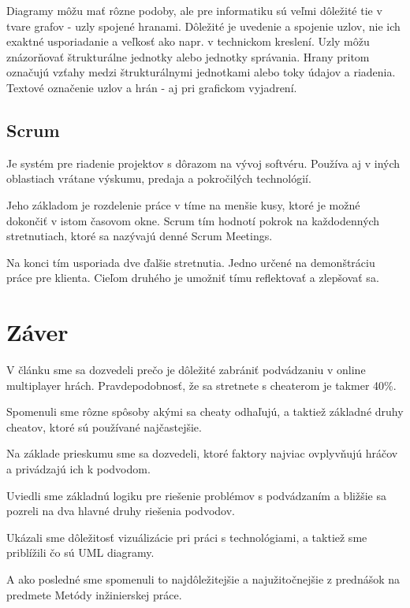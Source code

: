 \documentclass[10pt,twoside,slovak,a4paper]{article}
\begin{document}
Diagramy môžu mať rôzne podoby, ale pre informatiku sú veľmi dôležité tie v tvare grafov - uzly spojené hranami. Dôležité je uvedenie a spojenie uzlov, nie ich exaktné usporiadanie a veľkosť ako napr. v technickom kreslení. Uzly môžu znázorňovať štrukturálne jednotky alebo jednotky správania. Hrany pritom označujú vzťahy medzi štrukturálnymi jednotkami alebo toky údajov a riadenia. Textové označenie uzlov a hrán - aj pri grafickom vyjadrení.\cite{viz}

\hypertarget{scrum}{%
\subsection{Scrum}\label{scrum}}

Je systém pre riadenie projektov s dôrazom na vývoj softvéru. Používa aj v iných oblastiach vrátane výskumu, predaja a pokročilých technológií. 

Jeho základom je rozdelenie práce v tíme na menšie kusy, ktoré je možné dokončiť v istom časovom okne. Scrum tím hodnotí pokrok na každodenných stretnutiach, ktoré sa nazývajú denné Scrum Meetings. 

Na konci tím usporiada dve ďalšie stretnutia.  Jedno určené na demonštráciu práce pre klienta.  Cieľom druhého je umožniť tímu reflektovať a zlepšovať sa.\cite{scrum}
\newpage

\section{\texorpdfstring{Záver
}{Záver}\label{zaver}}

V článku sme sa dozvedeli prečo je dôležité zabrániť podvádzaniu v online multiplayer hrách. Pravdepodobnosť, že sa stretnete s cheaterom je takmer 40\%.

Spomenuli sme rôzne spôsoby akými sa cheaty odhaľujú, a taktiež základné druhy cheatov, ktoré sú používané najčastejšie.

Na základe prieskumu sme sa dozvedeli, ktoré faktory najviac ovplyvňujú hráčov a privádzajú ich k podvodom.

Uviedli sme základnú logiku pre riešenie problémov s podvádzaním a bližšie sa pozreli na dva hlavné druhy riešenia podvodov.

Ukázali sme dôležitosť vizuálizácie pri práci s technológiami, a taktiež sme priblížili čo sú UML diagramy.

A ako posledné sme spomenuli to najdôležitejšie a najužitočnejšie z prednášok na predmete Metódy inžinierskej práce.

\newpage




\end{document}
